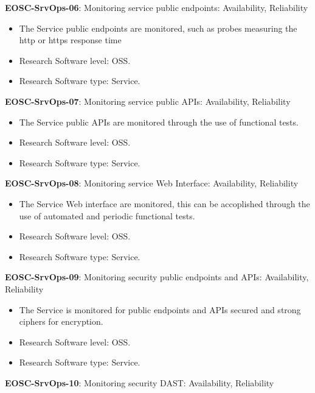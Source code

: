 \textbf{EOSC-SrvOps-06}: Monitoring service public endpoints: Availability, Reliability

\begin{itemize}
    \item The Service public endpoints are monitored, such as probes measuring the http or https response time \cite{orviz_fernandez_eosc-synergy_2020}
    \item Research Software level: OSS.
    \item Research Software type: Service.
\end{itemize}

\textbf{EOSC-SrvOps-07}: Monitoring service public APIs: Availability, Reliability

\begin{itemize}
    \item The Service public APIs are monitored through the use of functional tests. \cite{orviz_fernandez_eosc-synergy_2020}
    \item Research Software level: OSS.
    \item Research Software type: Service.
\end{itemize}

\textbf{EOSC-SrvOps-08}: Monitoring service Web Interface: Availability, Reliability

\begin{itemize}
    \item The Service Web interface are monitored, this can be accoplished through the use of automated and periodic functional tests. \cite{orviz_fernandez_eosc-synergy_2020}
    \item Research Software level: OSS.
    \item Research Software type: Service.
\end{itemize}

\textbf{EOSC-SrvOps-09}: Monitoring security public endpoints and APIs: Availability, Reliability

\begin{itemize}
    \item The Service is monitored for public endpoints and APIs secured and strong ciphers for encryption. \cite{orviz_fernandez_eosc-synergy_2020}
    \item Research Software level: OSS.
    \item Research Software type: Service.
\end{itemize}

\textbf{EOSC-SrvOps-10}: Monitoring security DAST: Availability, Reliability


